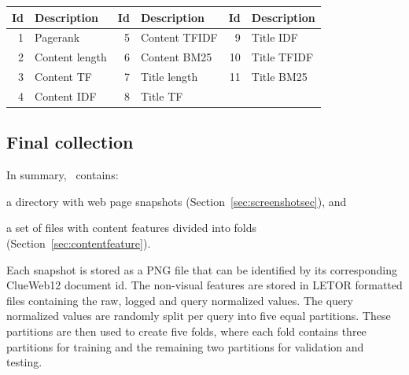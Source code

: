 \begin{table}[h]
\centering
{}  \label{tab:setdescription} 
\begin{tabular}{rlrlrl}
\toprule
Id & Description & Id & Description & Id & Description    \\ 
\midrule
1  & Pagerank  & 5  & Content TFIDF  & 9  & Title IDF   \\
2  & Content length & 6  & Content BM25   & 10 & Title TFIDF   \\
3  & Content TF  & 7  & Title length & 11 & Title BM25  \\
4  & Content IDF & 8  & Title TF  & & \\
\bottomrule
\end{tabular}
\end{table}





\subsection{Final collection}\label{sec:finalcollection}
In summary, \datasetname~contains:
\begin{inparaenum}[(i)]
\item a directory with web page snapshots (Section~\ref{sec:screenshotsec}), and
\item a set of files with content features divided into folds (Section~\ref{sec:contentfeature}).
\end{inparaenum}
Each snapshot is stored as a PNG file that can be identified by its corresponding ClueWeb12 document id. 
The non-visual features are stored in LETOR formatted files containing the raw, logged and query normalized values.
The query normalized values are randomly split per query into five equal partitions.
These partitions are then used to create five folds, where each fold contains three partitions for training and the remaining two partitions for validation and testing.


